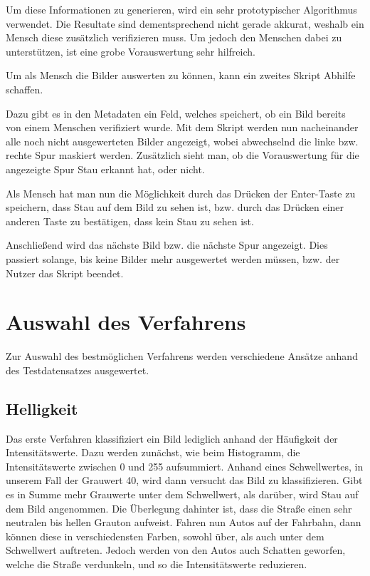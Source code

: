 Um diese Informationen zu generieren, wird ein sehr prototypischer Algorithmus verwendet. Die Resultate sind dementsprechend nicht gerade akkurat, weshalb ein Mensch diese zusätzlich verifizieren muss. Um jedoch den Menschen dabei zu unterstützen, ist eine grobe Vorauswertung sehr hilfreich.

Um als Mensch die Bilder auswerten zu können, kann ein zweites Skript Abhilfe schaffen.

Dazu gibt es in den Metadaten ein Feld, welches speichert, ob ein Bild bereits von einem Menschen verifiziert wurde.
Mit dem Skript werden nun nacheinander alle noch nicht ausgewerteten Bilder angezeigt, wobei abwechselnd die linke bzw. rechte Spur maskiert werden. Zusätzlich sieht man, ob die Vorauswertung für die angezeigte Spur Stau erkannt hat, oder nicht.

Als Mensch hat man nun die Möglichkeit durch das Drücken der Enter-Taste zu speichern, dass Stau auf dem Bild zu sehen ist, bzw. durch das Drücken einer anderen Taste zu bestätigen, dass kein Stau zu sehen ist.

Anschließend wird das nächste Bild bzw. die nächste Spur angezeigt.
Dies passiert solange, bis keine Bilder mehr ausgewertet werden müssen, bzw. der Nutzer das Skript beendet.

\section{Auswahl des Verfahrens}
Zur Auswahl des bestmöglichen Verfahrens werden verschiedene Ansätze anhand des Testdatensatzes ausgewertet.

\subsection{Helligkeit}
Das erste Verfahren klassifiziert ein Bild lediglich anhand der Häufigkeit der Intensitätswerte.
Dazu werden zunächst, wie beim Histogramm, die Intensitätswerte zwischen 0 und 255 aufsummiert.
Anhand eines Schwellwertes, in unserem Fall der Grauwert 40, wird dann versucht das Bild zu klassifizieren.
Gibt es in Summe mehr Grauwerte unter dem Schwellwert, als darüber, wird Stau auf dem Bild angenommen.
Die Überlegung dahinter ist, dass die Straße einen sehr neutralen bis hellen Grauton aufweist. Fahren nun Autos auf der Fahrbahn, dann können diese in verschiedensten Farben, sowohl über, als auch unter dem Schwellwert auftreten.
Jedoch werden von den Autos auch Schatten geworfen, welche die Straße verdunkeln, und so die Intensitätswerte reduzieren.
	
